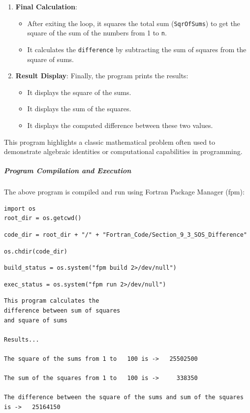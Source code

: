 \begin{enumerate}
\item \textbf{Final Calculation}:

\begin{itemize}
\item After exiting the loop, it squares the total sum (\texttt{SqrOfSums}) to get the square of the sum of the numbers from 1 to \texttt{n}.
\item It calculates the \texttt{difference} by subtracting the sum of squares from the square of sums.
\end{itemize}


\item \textbf{Result Display}: Finally, the program prints the results:

\begin{itemize}
\item It displays the square of the sums.
\item It displays the sum of the squares.
\item It displays the computed difference between these two values.
\end{itemize}
\end{enumerate}

This program highlights a classic mathematical problem often used to demonstrate algebraic identities or computational capabilities in programming.

\subparagraph{Program Compilation and Execution}

The above program is compiled and run using Fortran Package Manager (fpm):

\begin{verbatim}
import os
root_dir = os.getcwd()
\end{verbatim}

\begin{verbatim}
code_dir = root_dir + "/" + "Fortran_Code/Section_9_3_SOS_Difference"
\end{verbatim}

\begin{verbatim}
os.chdir(code_dir)
\end{verbatim}

\begin{verbatim}
build_status = os.system("fpm build 2>/dev/null")
\end{verbatim}

\begin{verbatim}
exec_status = os.system("fpm run 2>/dev/null")
\end{verbatim}

\begin{verbatim}
This program calculates the
difference between sum of squares 
and square of sums

Results...

The square of the sums from 1 to   100 is ->   25502500

The sum of the squares from 1 to   100 is ->     338350

The difference between the square of the sums and sum of the squares is ->   25164150
\end{verbatim}